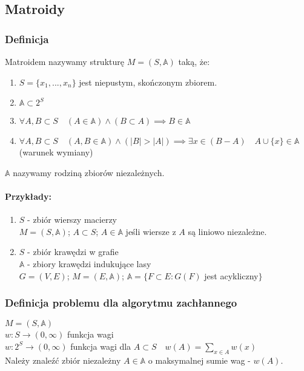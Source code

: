 \subsection{Matroidy}
\subsubsection{Definicja}
Matroidem nazywamy strukturę $M = (S,\mathbb{A})$ taką, że:
\begin{enumerate}
	\item $S = \{x_1, ... , x_n \}$ jest niepustym, skończonym zbiorem.
	\item $\mathbb{A} \subset 2^S$
	\item $\forall{A,B \subset S} \quad (A \in \mathbb{A}) \land (B \subset A) \implies B \in \mathbb{A}$
	\item $\forall{A,B \subset S} \quad (A,B \in \mathbb{A}) \land (\vert B \vert > \vert A \vert) \implies \exists{x} \in (B - A) \quad A \cup \{x\} \in \mathbb{A} $ (warunek wymiany)
\end{enumerate}
$\mathbb{A}$ nazywamy rodziną zbiorów niezależnych.

\paragraph{Przykłady:} 
\begin{enumerate}
	\item $S$ - zbiór wierszy macierzy \\
	$M = (S,\mathbb{A})$;
	$A \subset S$;
	$A\in\mathbb{A}$ jeśli wiersze z $A$ są liniowo niezależne.

	\item $S$ - zbiór krawędzi w grafie \\
	$\mathbb{A}$ - zbiory krawędzi indukujące lasy \\
	$G = (V,E)$; \quad
	$M = (E,\mathbb{A})$; \quad  
	$\mathbb{A} = \{F \subset E : G(F)$ jest acykliczny$\}$
\end{enumerate}

\subsubsection{Definicja problemu dla algorytmu zachłannego}
$M = (S,\mathbb{A})$\\
$w:S \rightarrow (0,\infty)$ funkcja wagi \\
$w:2^S \rightarrow (0, \infty) $ funkcja wagi dla $A \subset S \quad w(A) = \sum_{x \in A} w(x)$ \\
Należy znaleźć zbiór niezależny $A \in \mathbb{A}$ o maksymalnej sumie wag - $w(A)$.

